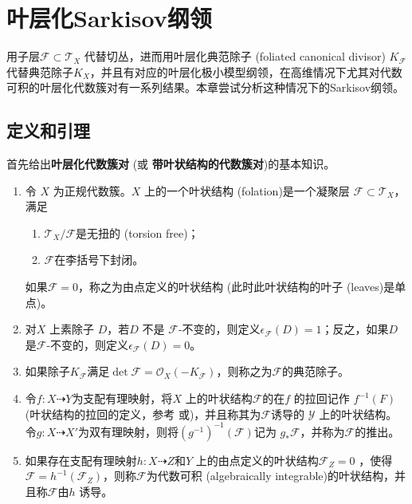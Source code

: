 \chapter{叶层化Sarkisov纲领}
用子层$\mathcal{F} \subset \mathcal{T}_{X}$ 代替切丛，进而用叶层化典范除子 (foliated canonical divisor) $K_{\mathcal{F}}$代替典范除子$K_{X}$，并且有对应的叶层化极小模型纲领，在高维情况下尤其对代数可积的叶层化代数簇对有一系列结果。本章尝试分析这种情况下的Sarkisov纲领。
\section{定义和引理}
首先给出\textbf{叶层化代数簇对} (或 \textbf{带叶状结构的代数簇对})的基本知识。

\begin{definition}\cite[Definition 2.3-6]{acc_foliation}
  \begin{enumerate}
    \item 令 $X$ 为正规代数簇。$X$ 上的一个叶状结构 (folation)是一个凝聚层 $\mathcal{F} \subset \mathcal{T}_{X}$，满足
          \begin{enumerate}
            \item $\mathcal{T}_{X}/\mathcal{F}$是无扭的 (torsion free)；
            \item $\mathcal{F}$在李括号下封闭。 
          \end{enumerate}
          如果$\mathcal{F}=0$，称之为由点定义的叶状结构 (此时此叶状结构的叶子 (leaves)是单点)。
    \item 对$X$ 上素除子 $D$，若$D$ 不是 $\mathcal{F}$-不变的，则定义$\epsilon_{\mathcal{F}}(D)=1 $；反之，如果$D$ 是$\mathcal{F}$-不变的，则定义$\epsilon_{\mathcal{F}}(D)=0$。
    \item 如果除子$K_{\mathcal{F}}$满足$\det \mathcal{F} = \mathcal{O}_{X}(-K_{\mathcal{F}})$，则称之为$\mathcal{F}$的典范除子。
    \item 令$f:X \dashrightarrow Y$为支配有理映射，将$X$ 上的叶状结构$\mathcal{F}$的在$f$ 的拉回记作  $ f^{-1}(F) $ (叶状结构的拉回的定义，参考\cite[3.1]{acss} 或\cite[3.2]{cs21})，并且称其为$\mathcal{F}$诱导的 $\mathcal{Y}$ 上的叶状结构。令$g:X \dashrightarrow X' $为双有理映射，则将$(g^{-1})^{-1}(\mathcal{F})$记为 $g_{*}\mathcal{F}$，并称为$\mathcal{F}$的推出。
    \item 如果存在支配有理映射$h:X \dashrightarrow  Z$和$Y$ 上的由点定义的叶状结构$\mathcal{F}_{Z}=0$  ，使得  $\mathcal{F}=h^{-1}(\mathcal{F}_{Z})$，则称$\mathcal{F}$为代数可积 (algebraically integrable)的叶状结构，并且称$\mathcal{F}$由$h$ 诱导。 
  \end{enumerate}
\end{definition}
